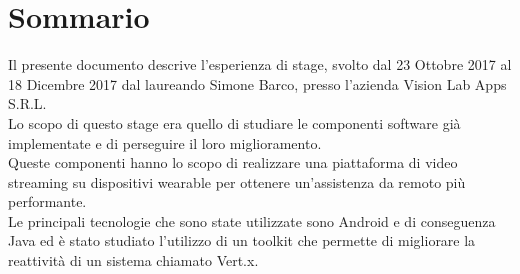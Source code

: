 
\cleardoublepage
{}
\begingroup
\let\clearpage\relax
\let\cleardoublepage\relax
\let\cleardoublepage\relax

\thispagestyle{empty}

\thispagestyle{empty}
\chapter*{Sommario}

Il presente documento descrive l'esperienza di stage, svolto dal 23 Ottobre 2017 al 18 Dicembre 2017 dal laureando Simone Barco, presso l'azienda Vision Lab Apps S.R.L.\\
Lo scopo di questo stage era quello di studiare le componenti software già implementate e di  perseguire il loro miglioramento.\\
Queste componenti hanno lo scopo di realizzare una piattaforma di video streaming su dispositivi wearable per ottenere un'assistenza da remoto più performante.\\
Le principali tecnologie che sono state utilizzate sono Android e di conseguenza Java ed è stato studiato l'utilizzo di un toolkit che permette di migliorare la reattività di un sistema chiamato Vert.x.


%
%

\newpage
\null
\thispagestyle{empty}
\newpage
